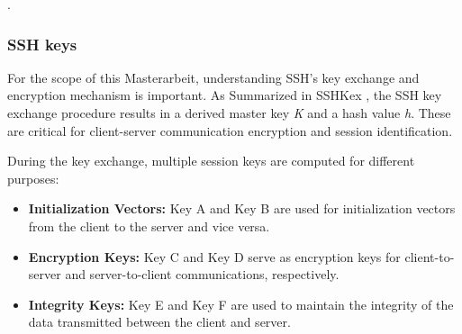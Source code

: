      \cite{RFC4251}.

    \subsubsection{SSH keys}\label{sec:background:ssh:ssh_keys}
    For the scope of this Masterarbeit, understanding SSH's key exchange and encryption mechanism is important. As Summarized in SSHKex \cite{SSHkex22}, the SSH key exchange procedure results in a derived master key \textit{K} and a hash value \textit{h}. These are critical for client-server communication encryption and session identification.

    During the key exchange, multiple session keys are computed for different purposes:

    \begin{itemize}
        \item \textbf{Initialization Vectors:} Key A and Key B are used for initialization vectors from the client to the server and vice versa.
        \item \textbf{Encryption Keys:} Key C and Key D serve as encryption keys for client-to-server and server-to-client communications, respectively.
        \item \textbf{Integrity Keys:} Key E and Key F are used to maintain the integrity of the data transmitted between the client and server.
    \end{itemize}

